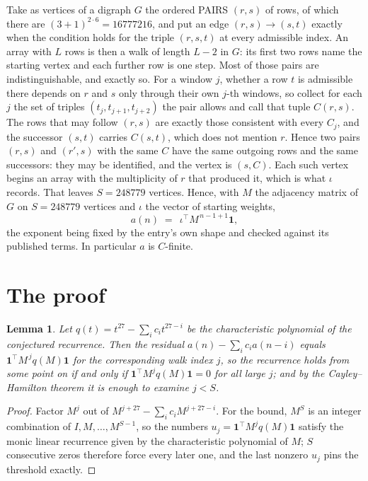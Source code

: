 \documentclass[11pt,a4paper]{article}
\theoremstyle{plain}
\newtheorem{lemma}[theorem]{Lemma}
\theoremstyle{definition}
\begin{document}
Take as vertices of a digraph $G$ the ordered PAIRS $(r,s)$ of rows, of which there are
$(3+1)^{2\cdot6}=16777216$, and put an edge $(r,s)\to(s,t)$ exactly when the condition
holds for the triple $(r,s,t)$ at every admissible index. An array with $L$ rows is then a
walk of length $L-2$ in $G$: its first two rows name the starting vertex and each further
row is one step. Most of those pairs are indistinguishable, and exactly so. For a window $j$, whether a row $t$ is admissible there depends on $r$ and $s$ only through their own $j$-th windows, so collect for each $j$ the set of triples $(t_j,t_{j+1},t_{j+2})$ the pair allows and call that tuple $C(r,s)$. The rows that may follow $(r,s)$ are exactly those consistent with every $C_j$, and the successor $(s,t)$ carries $C(s,t)$, which does not mention $r$. Hence two pairs $(r,s)$ and $(r',s)$ with the same $C$ have the same outgoing rows and the same successors: they may be identified, and the vertex is $(s,C)$. Each such vertex begins an array with the multiplicity of $r$ that produced it, which is what $\iota$ records. That leaves $S=248779$ vertices. Hence, with $M$ the adjacency matrix of $G$ on $S=248779$ vertices and
$\iota$ the vector of starting weights,
\[
a(n)\;=\;\,\iota^{\!\top}M^{\,n-1+1}\mathbf{1},
\]
the exponent being fixed by the entry's own shape and checked against its published terms.
In particular $a$ is $C$-finite.

\section{The proof}

\begin{lemma}\label{lem:crit}
Let $q(t)=t^{27}-\sum_i c_it^{27-i}$ be the characteristic polynomial of the
conjectured recurrence. Then the residual $a(n)-\sum_ic_ia(n-i)$ equals
$\mathbf{1}^{\!\top}M^{\,j}q(M)\mathbf{1}$ for the corresponding walk index
$j$, so the recurrence holds from some point on if and only if
$\mathbf{1}^{\!\top}M^{j}q(M)\mathbf{1}=0$ for all large $j$; and by the
Cayley--Hamilton theorem it is enough to examine $j<S$.
\end{lemma}

\begin{proof}
Factor $M^{j}$ out of $M^{j+27}-\sum_ic_iM^{j+27-i}$. For the bound, $M^{S}$
is an integer combination of $I,M,\dots,M^{S-1}$, so the numbers
$u_j=\mathbf{1}^{\!\top}M^{j}q(M)\mathbf{1}$ satisfy the monic linear recurrence given by
the characteristic polynomial of $M$; $S$ consecutive zeros therefore force every later one,
and the last nonzero $u_j$ pins the threshold exactly.
\end{proof}
\end{document}
